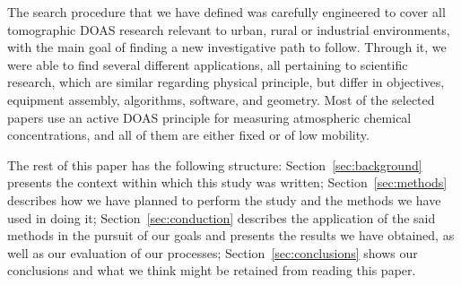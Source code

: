The search procedure that we have defined was carefully engineered to
cover all tomographic DOAS research relevant to urban, rural or
industrial environments, with the main goal of finding a new
investigative path to follow. Through it, we were able to find several
different applications, all pertaining to scientific research, which are
similar regarding physical principle, but differ in objectives,
equipment assembly, algorithms, software, and geometry. Most of the
selected papers use an active DOAS principle for measuring atmospheric
chemical concentrations, and all of them are either fixed or of low
mobility. 

The rest of this paper has the following structure:
Section~\ref{sec:background} presents the context within which this
study was written; Section~\ref{sec:methods} describes how we have
planned to perform the study and the methods we have used in doing it;
Section~\ref{sec:conduction} describes the application of the said
methods in the pursuit of our goals and presents the results we have
obtained, as well as our evaluation of our processes;
Section~\ref{sec:conclusions} shows our conclusions and what we think
might be retained from reading this paper.
